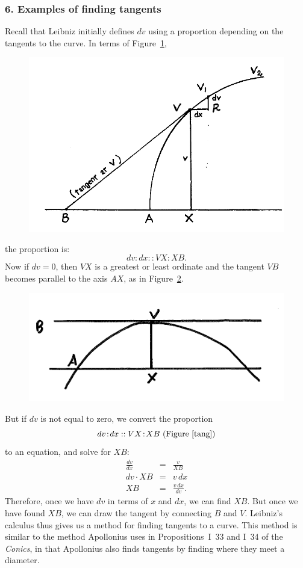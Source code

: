 \documentclass[twoside,openright]{article}
\begin{document}
\subsubsection*{6. Examples of finding tangents}
Recall that Leibniz initially defines $dv$ using a proportion
depending on the tangents to the curve.  In terms of
Figure~\ref{tang},
\begin{figure}[htp]
\begin{center}
\includegraphics[width=.85\textwidth]{fig/Figure16}
\caption{}
\label{tang}
\vspace{-10pt}
\end{center}
\end{figure}
the proportion is:
$$dv \!:\! dx :: VX \!:\! XB.$$
Now if $dv=0$, then $VX$ is a greatest or least ordinate and the tangent $VB$ becomes parallel to the axis $AX$, as in Figure~\ref{htang}.
\begin{figure}[htp]
\begin{center}
\includegraphics[width=.75\textwidth]{fig/Figure16A}
\caption{}
\label{htang}
\vspace{-10pt}
\end{center}
\end{figure}


But if $dv$ is not equal to zero, we convert the proportion
$$dv \!:\! dx :: VX \!:\! XB \mbox{ (Figure~\ref{tang})}$$
 to an equation, and solve for $XB$:
\setlength{\jot}{1.5ex}
\begin{eqnarray*}
\frac{dv}{dx} & = & \frac{v}{XB} \\
dv \cdot XB & = & v\,dx\\
XB &= &\frac{v\,dx}{dv}.
\end{eqnarray*}
Therefore, once we have $dv$ in terms of $x$ and $dx$, we can find
$XB$.  But once we have found $XB$, we can draw the tangent by
connecting $B$ and $V$.  Leibniz's calculus thus gives us a method for
finding tangents to a curve.  This method is similar to the method
Apollonius uses in Propositions~I~33 and I~34 of the {\em Conics}, in
that Apollonius also finds tangents by finding where they meet a
diameter. 
\end{document}

